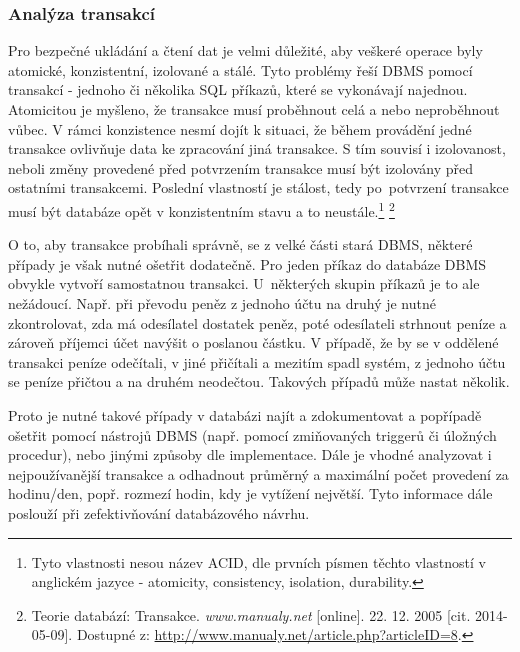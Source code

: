 \documentclass[11pt,a4paper]{article}
\begin{document}
\subsubsection{Analýza transakcí}
Pro bezpečné ukládání a čtení dat je velmi důležité, aby veškeré operace byly atomické, konzistentní, izolované a stálé. Tyto problémy řeší DBMS pomocí transakcí - jednoho či několika SQL příkazů, které se vykonávají najednou. Atomicitou je myšleno, že transakce musí proběhnout celá a nebo neproběhnout vůbec. V rámci konzistence nesmí dojít k situaci, že během provádění jedné transakce ovlivňuje data ke zpracování jiná transakce. S tím souvisí i izolovanost, neboli změny provedené před potvrzením transakce musí být izolovány před ostatními transakcemi. Poslední vlastností je stálost, tedy po~potvrzení transakce musí být databáze opět v konzistentním stavu a to neustále.\footnote{Tyto vlastnosti nesou název ACID, dle prvních písmen těchto vlastností v anglickém jazyce - atomicity, consistency, isolation, durability.} \footnote{Teorie databází: Transakce. \textit{www.manualy.net} [online]. 22. 12. 2005 [cit. 2014-05-09]. Dostupné z: \url{http://www.manualy.net/article.php?articleID=8}.}

O to, aby transakce probíhali správně, se z velké části stará DBMS, některé případy je však nutné ošetřit dodatečně. Pro jeden příkaz do databáze DBMS obvykle vytvoří samostatnou transakci. U~některých skupin příkazů je to ale nežádoucí. Např. při převodu peněz z jednoho účtu na druhý je nutné zkontrolovat, zda má odesílatel dostatek peněz, poté odesílateli strhnout peníze a zároveň příjemci účet navýšit o poslanou částku. V případě, že by se v oddělené transakci peníze odečítali, v jiné přičítali a mezitím spadl systém, z jednoho účtu se peníze přičtou a na druhém neodečtou. Takových případů může nastat několik. 

Proto je nutné takové případy v databázi najít a zdokumentovat a popřípadě ošetřit pomocí nástrojů DBMS (např. pomocí zmiňovaných triggerů či úložných procedur), nebo jinými způsoby dle implementace. Dále je vhodné analyzovat i nejpoužívanější transakce a odhadnout průměrný a maximální počet provedení za hodinu/den, popř. rozmezí hodin, kdy je vytížení největší. Tyto informace dále poslouží při zefektivňování databázového návrhu. 
\end{document}
